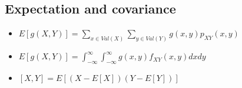 \documentclass{article}
\begin{document}
    \subsection{Expectation and covariance}
    \begin{itemize}
        \item $E[g(X,Y)] = \sum_{x \in Val(X)} \sum_{y \in Val(Y)} g(x, y)p_{XY}(x, y)$
        \item $E[g(X, Y)] = \int^{\infty}_{-\infty} \int^{\infty}_{-\infty} g(x, y)f_{XY}(x, y)dxdy$
        \item $[X,Y] = E[(X − E[X])(Y−E[Y])]$
    \end{itemize}

\printbibliography[title={Referências}]
\end{document}
